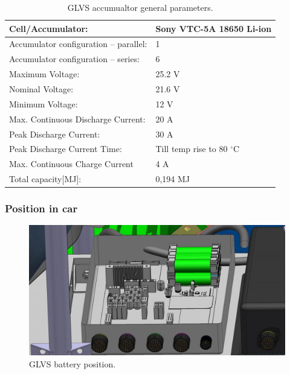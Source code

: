 \begin{table}[H]
	\centering
	\caption{GLVS accumualtor general parameters.}
	\begin{tabularx}{\textwidth}{|X|X|}\hline
		Cell/Accumulator: & Sony VTC-5A 18650 Li-ion\\[\TableSize]\hline
		Accumulator configuration – parallel: & 1 \\[\TableSize]\hline
		Accumulator configuration – series: & 6 \\[\TableSize]\hline
		Maximum Voltage: & 25.2 V \\[\TableSize]\hline
		Nominal Voltage: & 21.6 V \\[\TableSize]\hline
		Minimum Voltage: & 12 V \\[\TableSize]\hline
		Max. Continuous Discharge Current: & 20 A \\[\TableSize]\hline
		Peak Discharge Current: & 30 A \\[\TableSize]\hline
		Peak Discharge Current Time: & Till temp rise to 80 $^\circ$C \\[\TableSize]\hline
		Max. Continuous Charge Current & 4 A\\[\TableSize]\hline
		Total capacity[MJ]: & 0,194 MJ \\[\TableSize]\hline
	\end{tabularx}%
	\label{tab:LVbatt-general}%
\end{table}%

\subsubsection{Position in car}

\begin{figure}[H]
	\centering
	\includegraphics[width=\textwidth,clip]{./img/ECUB_BATTERY_POSITION.jpg}
	\caption{GLVS battery position.}
	\label{fig:GLVS_battery_position}
\end{figure}